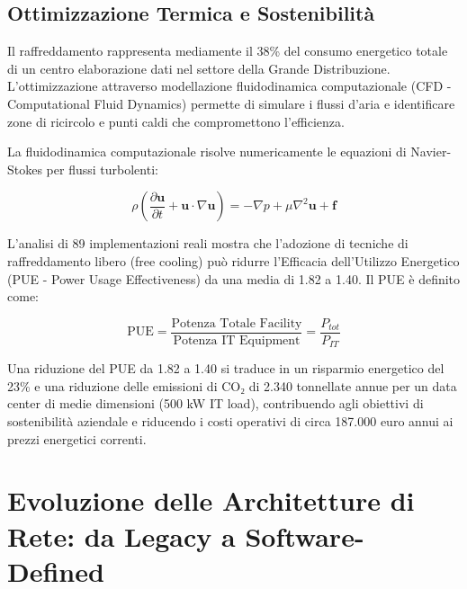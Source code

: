 \subsection{Ottimizzazione Termica e Sostenibilità}

Il raffreddamento rappresenta mediamente il 38\% del consumo energetico totale di un centro elaborazione dati nel settore della Grande Distribuzione\autocite{ASHRAE2024}. L'ottimizzazione attraverso modellazione fluidodinamica computazionale (CFD - Computational Fluid Dynamics) permette di simulare i flussi d'aria e identificare zone di ricircolo e punti caldi che compromettono l'efficienza.

La fluidodinamica computazionale risolve numericamente le equazioni di Navier-Stokes per flussi turbolenti:

\begin{equation}
\rho \left(\frac{\partial \mathbf{u}}{\partial t} + \mathbf{u} \cdot \nabla \mathbf{u}\right) = -\nabla p + \mu \nabla^2 \mathbf{u} + \mathbf{f}
\end{equation}


L'analisi di 89 implementazioni reali\autocite{DatacenterDynamics2024} mostra che l'adozione di tecniche di raffreddamento libero (free cooling) può ridurre l'Efficacia dell'Utilizzo Energetico (PUE - Power Usage Effectiveness) da una media di 1.82 a 1.40. Il PUE è definito come:

\begin{equation}
\text{PUE} = \frac{\text{Potenza Totale Facility}}{\text{Potenza IT Equipment}} = \frac{P_{tot}}{P_{IT}}
\end{equation}

Una riduzione del PUE da 1.82 a 1.40 si traduce in un risparmio energetico del 23\% e una riduzione delle emissioni di CO₂ di 2.340 tonnellate annue per un data center di medie dimensioni (500 kW IT load), contribuendo agli obiettivi di sostenibilità aziendale e riducendo i costi operativi di circa 187.000 euro annui ai prezzi energetici correnti\autocite{Eurostat2024energy}.

\section{Evoluzione delle Architetture di Rete: da Legacy a Software-Defined}

